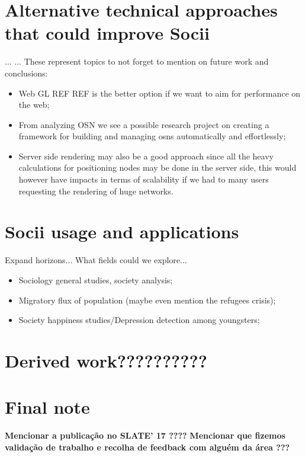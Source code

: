 \section{Alternative technical approaches that could improve Socii}
...
...
These represent topics to not forget to mention on future work and conclusions:
\begin{itemize}
    \item Web GL REF REF is the better option if we want to aim for performance on the web;
    \item From analyzing OSN we see a possible research project on creating a framework for building
    and managing \glspl{osn} automatically and effortlessly;
    \item Server side rendering may also be a good approach since all the heavy calculations for positioning nodes
    may be done in the server side, this would however have impacts in terms of scalability if we had to many users requesting
    the rendering of huge networks.
\end{itemize}

\section{Socii usage and applications}
Expand horizons... What fields could we explore...\\
\begin{itemize}
    \item Sociology general studies, society analysis;
    \item Migratory flux of population (maybe even mention the refugees crisis);
    \item Society happiness studies/Depression detection among youngsters;
\end{itemize}
\section{Derived work??????????}

\section{Final note}
\textbf{Mencionar a publicação no SLATE' 17 ????}
\textbf{Mencionar que fizemos validação de trabalho e recolha de feedback com alguém da área ???}